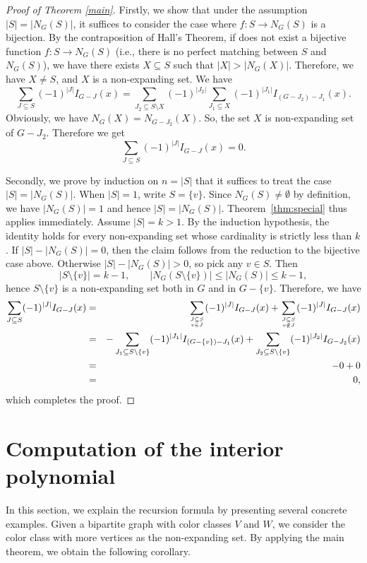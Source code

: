\documentclass{amsart}
\theoremstyle{definition}
\theoremstyle{remark}
\numberwithin{equation}{section}
\begin{document}
\begin{proof}[Proof of Theorem \ref{main}]
Firstly, we show that under the assumption $|S| = |N_G(S)|$, it suffices to consider the case where $f: S \to N_G(S)$ is a bijection. By the contraposition of Hall's Theorem, if does not exist a bijective function $f:S\to N_G(S)$ (i.e., there is no perfect matching between $S$ and $N_G(S)$), we have there exists $X\subseteq S$ such that $|X|>|N_G(X)|$. Therefore, we have $X\ne S$, and $X$ is a non-expanding set. We have
\[
\sum_{J\subseteq S}(-1)^{|J|}I_{G-J}(x)
=\sum_{J_2\subseteq S\setminus X}(-1)^{|J_2|}\sum_{J_1\subseteq X}(-1)^{|J_1|}I_{(G-J_2)-J_1}(x).
\]
Obviously, we have $N_G(X)=N_{G-J_2}(X)$. So, the set $X$ is non-expanding set of $G-J_2$. Therefore we get
\[
\sum_{J\subseteq S}(-1)^{|J|}I_{G-J}(x)=0.
\]

Secondly, we prove by induction on $n = |S|$ that it suffices to treat the case $|S| = |N_G(S)|$. When $|S|=1$, write $S=\{v\}$.  Since $N_G(S)\neq\emptyset$ by definition, we have $|N_G(S)|=1$ and hence $|S|=|N_G(S)|$. Theorem~\ref{thm:special} thus applies immediately. Assume $|S|=k>1$.  By the induction hypothesis, the identity holds for every non-expanding set whose cardinality is strictly less than $k$. If $|S| - |N_G(S)| = 0$, then the claim follows from the reduction to the bijective case above. Otherwise $|S|-|N_G(S)|>0$, so pick any $v\in S$.  Then
\[
|S\setminus\{v\}|=k-1,
\qquad
|N_G(S\setminus\{v\})|\le|N_G(S)|\le k-1,
\]
hence $S\setminus\{v\}$ is a non‐expanding set both in $G$ and in $G-\{v\}$. Therefore, we have
\begin{eqnarray*}
\sum_{J\subseteq S}(-1)^{|J|}I_{G-J}(x)
&=&\sum_{J\subseteq S \atop v\in J}(-1)^{|J|}I_{G-J}(x)+\sum_{J\subseteq S\atop v\notin J}(-1)^{|J|}I_{G-J}(x)\\
&=&-\sum_{J_1\subseteq S \setminus \{v\}}(-1)^{|J_1|}I_{(G-\{v\})-J_1}(x)+\sum_{J_2\subseteq S\setminus \{v\}}(-1)^{|J_2|}I_{G-J_2}(x)\\
&=&-0+0\\
&=&0,
\end{eqnarray*}
which completes the proof.

\end{proof}


\section{Computation of the interior polynomial}\label{sec:computation}

In this section, we explain the recursion formula by presenting several concrete examples. Given a bipartite graph with color classes $V$ and $W$, we consider the color class with more vertices as the non-expanding set. By applying the main theorem, we obtain the following corollary.
\end{document}

